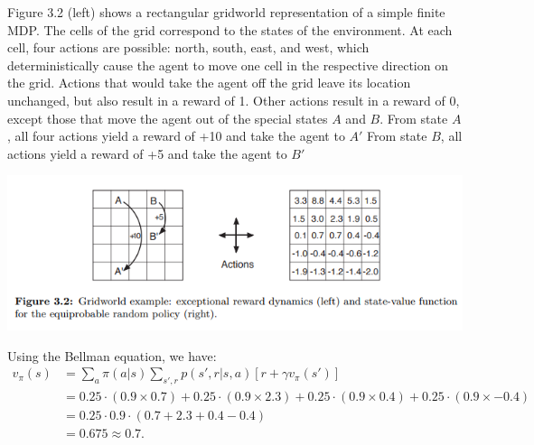 Figure 3.2 (left) shows a rectangular gridworld representation
of a simple finite MDP. The cells of the grid correspond to the states of the environment. At
each cell, four actions are possible: north, south, east, and west, which deterministically
cause the agent to move one cell in the respective direction on the grid. Actions that
would take the agent off the grid leave its location unchanged, but also result in a reward
of 1. Other actions result in a reward of 0, except those that move the agent out of the
special states $A$ and $B$. From state $A$, all four actions yield a reward of +10 and take the
agent to $A'$
From state $B$, all actions yield a reward of +5 and take the agent to $B'$

\includegraphics[scale=0.7]{./gridworld.png}

{
    Using the Bellman equation, we have:
    \begin{align*}
        v_\pi(s) & = \sum_a \pi(a|s) \sum_{s',r} p(s', r | s, a) \left[r + \gamma v_\pi(s')\right] \\
        & = 0.25 \cdot (0.9 \times 0.7) + 0.25 \cdot (0.9 \times 2.3) + 0.25 \cdot (0.9 \times 0.4) + 0.25 \cdot (0.9 \times -0.4) \\
        & = 0.25 \cdot 0.9 \cdot (0.7 + 2.3 + 0.4 - 0.4) \\
        & = 0.675 \approx 0.7.
    \end{align*}
}

